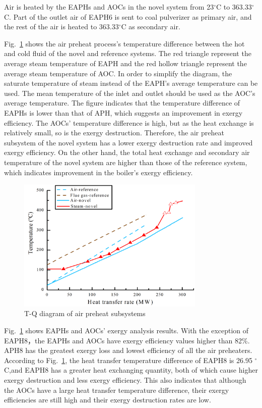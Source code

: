 \documentclass[preprint,12pt]{elsarticle}
\begin{document}
Air is heated by the EAPHs and AOCs in the novel system from 23$^\circ$C to 363.33$^\circ$C. 
Part of the outlet air of EAPH6 is sent to coal pulverizer as primary air, and the rest of the air is heated to 363.33$^\circ$C as secondary air. 

Fig.~\ref{fig:APH_temper_compare} shows the air preheat process's temperature difference between the hot and cold fluid of the novel and reference systems.
The red triangle represent the average steam temperature of EAPH and the red hollow triangle represent the average steam temperature of AOC.
In order to simplify the diagram, the saturate temperature of steam instead of the EAPH's average temperature can be used. The mean temperature of the inlet and outlet should be used as the AOC's average temperature.
The figure indicates that the temperature difference of EAPHs is lower than that of APH, which suggests an improvement in exergy efficiency.
The AOCs' temperature difference is high, but as the heat exchange is relatively small, so is the exergy destruction. 
Therefore, the air preheat subsystem of the novel system has a lower exergy destruction rate and improved exergy efficiency.
On the other hand, the total heat exchange and secondary air temperature of the novel system are higher than those of the reference system, which indicates improvement in the boiler's exergy efficiency.

\begin{figure}[htbp]
\centering
\includegraphics[width=0.8\textwidth]{fig/APH_temper_compare.png}
\caption{T-Q diagram of air preheat subsystems} 
\label{fig:APH_temper_compare}
\end{figure}


Fig.~\ref{fig:APH_temper_compare} shows EAPHs and AOCs' exergy analysis results. 
With the exception of EAPH8，the EAPHs and AOCs have exergy efficiency values higher than 82\%. APH8 has the greatest exergy loss and lowest efficiency of all the air preheaters. 
According to Fig.~\ref{fig:APH_temper_compare}, the heat transfer temperature difference of EAPH8 is 26.95 $^\circ$C,and EAPH8 has a greater heat exchanging quantity, both of which cause higher exergy destruction and less exergy efficiency.
This also indicates that although the AOCs have a large heat transfer temperature difference, their exergy efficiencies are still high and their exergy destruction rates are low.
\end{document}
